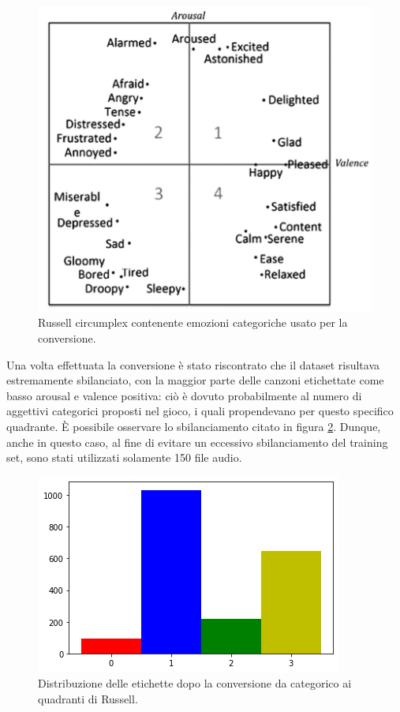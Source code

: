\documentclass[11pt]{report}
\begin{document}
\begin{figure}
\centering
\includegraphics[scale = 0.6]{img/categorical-to-russell.PNG}
\caption{Russell circumplex contenente emozioni categoriche usato per la conversione\cite{panda2018novel}.}
\label{fig-emotify}
\end{figure}


Una volta effettuata la conversione è stato riscontrato che il dataset risultava estremamente sbilanciato, con la maggior parte delle canzoni etichettate come basso arousal e valence positiva: ciò è dovuto probabilmente al numero di aggettivi categorici proposti nel gioco, i quali propendevano per questo specifico quadrante. È possibile osservare lo sbilanciamento citato in figura \ref{fig-emotify2}.
Dunque, anche in questo caso, al fine di evitare un eccessivo sbilanciamento del training set, sono stati utilizzati solamente 150 file audio.


\begin{figure}[h]
\centering
\includegraphics[scale = 0.6]{img/Emotify_class.png}
\caption{ Distribuzione delle etichette dopo la
conversione da categorico ai quadranti di Russell.}
\label{fig-emotify2}
\end{figure}
\end{document}
